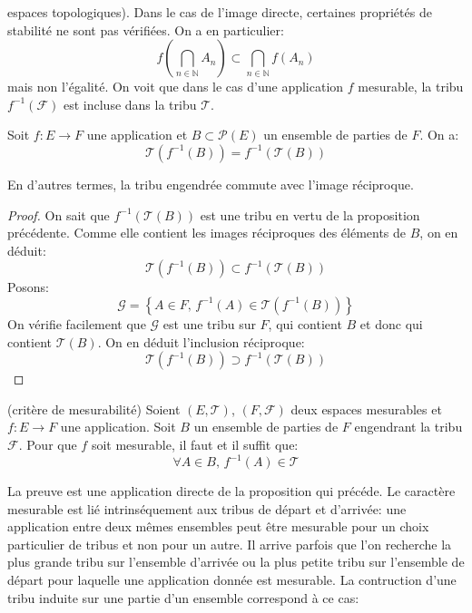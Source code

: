 espaces topologiques). Dans le cas de l'image directe, certaines propriétés de
stabilité ne sont pas vérifiées. On a en particulier:
 \[
 f\left(\bigcap_{n \in \mathbb{N}} A_n\right) \subset \bigcap_{n \in
 \mathbb{N}} f\left(A_n\right)
\]
mais non l'égalité.
On voit que dans le cas d'une application $f$ mesurable, la tribu
$f^{-1}\left(\mathcal{F}\right)$ est incluse dans la tribu $\mathcal{T}$.
\begin{prop}
Soit $f \colon E \to F$ une application et $B \subset \mathcal{P}(E)$ un
ensemble de parties de $F$. On a:
\[
\mathcal{T}\left(f^{-1}(B)\right) = f^{-1}\left(\mathcal{T}\left(B\right)\right)
\]
\end{prop}
En d'autres termes, la tribu engendrée commute avec l'image réciproque.
\begin{proof}
On sait que $f^{-1}\left(\mathcal{T}\left(B\right)\right)$ est une tribu en
vertu de la proposition précédente. Comme elle contient les images réciproques
des éléments de $B$, on en déduit:
\[
\mathcal{T}\left(f^{-1}(B)\right) \subset
f^{-1}\left(\mathcal{T}\left(B\right)\right)
\]
Posons:
\[
\mathcal{G}= \left\{ A \in F, \, f^{-1}(A) \in \mathcal{T}\left(
f^{-1}(B)\right)\right\}
\]
On vérifie facilement que $\mathcal{G}$ est une tribu sur $F$, qui contient $B$
et donc qui contient $\mathcal{T}\left(B\right)$. On en déduit l'inclusion
réciproque:
\[
\mathcal{T}\left(f^{-1}(B)\right) \supset
f^{-1}\left(\mathcal{T}\left(B\right)\right)
\]
\end{proof}
\begin{mandatory}
\begin{corollaire}(critère de mesurabilité)
Soient $(E, \mathcal{T})$, $(F, \mathcal{F})$ deux espaces mesurables et $f :
E \to F$ une application. Soit $B$ un ensemble de parties de $F$ engendrant la
tribu $\mathcal{F}$. Pour que $f$ soit mesurable, il faut et il suffit que:
\[
\forall A \in B, \, f^{-1}(A) \in \mathcal{T}
\]
\end{corollaire}
\end{mandatory}
La preuve est une application directe de la proposition qui précéde.
Le caractère mesurable est lié intrinséquement aux tribus de départ et
d'arrivée: une application entre deux mêmes ensembles peut être mesurable pour
un choix particulier de tribus et non pour un autre. Il arrive parfois que l'on
recherche la plus grande tribu sur l'ensemble d'arrivée ou la plus petite tribu
sur l'ensemble de départ pour laquelle une application donnée est mesurable. La
contruction d'une tribu induite sur une partie d'un ensemble correspond à ce
cas:
